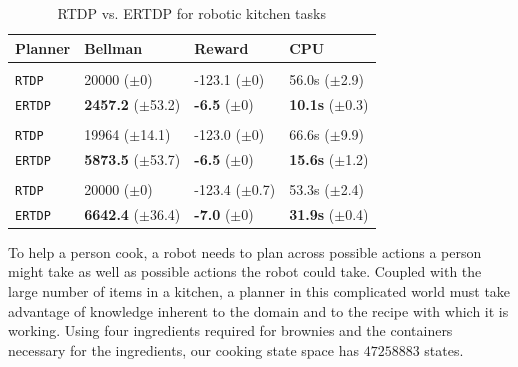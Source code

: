 \documentclass[letterpaper]{article}
\newcommand{\ra}[1]{\renewcommand{\arraystretch}{#1}} %
\begin{document}
\begin{table}[t]
\ra{1.1}
\small
\begin{tabular}{@{}llll@{}}\toprule
Planner & Bellman & Reward & CPU \\ \midrule
&\hspace{-10mm}{\it Dry Ingredients} \\
\texttt{RTDP} 	& 20000 ($\pm$0) 			& {-123.1} ($\pm$0)  & {56.0s}   ($\pm$2.9) \\
\texttt{ERTDP} 	& {\bf 2457.2} ($\pm$53.2) 		& {\bf -6.5}   ($\pm$0) & {\bf 10.1s}   ($\pm$0.3) \\  \hline
&\hspace{-10mm}{\it Wet Ingredients} \\
\texttt{RTDP} 	& 19964 ($\pm$14.1) 			& { -123.0}   ($\pm$0) & 66.6s   ($\pm$9.9) \\
\texttt{ERTDP} 	& {\bf 5873.5} ($\pm$53.7) 		& {\bf -6.5}   ($\pm$0) & {\bf 15.6s}   ($\pm$1.2) \\ \hline
&\hspace{-10mm}{\it Brownie Batter} \\
\texttt{RTDP} 	& 20000 ($\pm$0) 			& -123.4   ($\pm$0.7) & { 53.3s}   ($\pm$2.4) \\
\texttt{ERTDP} 	& {\bf 6642.4} ($\pm$36.4) 		& {\bf -7.0}   ($\pm$0) & {\bf 31.9s}   ($\pm$0.4) \\ 
\bottomrule
\end{tabular}
\caption{RTDP vs. ERTDP for robotic kitchen tasks}
\label{table:baxter_results}
\end{table}


To help a person cook, a robot needs to plan across possible actions a
person might take as well as possible actions the robot could take.
Coupled with the large number of items in a kitchen, a planner in this
complicated world must take advantage of knowledge inherent to the
domain and to the recipe with which it is working. Using four ingredients 
required for brownies and the containers necessary for the ingredients, our
cooking state space has $\num[round-precision=3, round-mode=figures]{47258883}$ states.  
\end{document}
